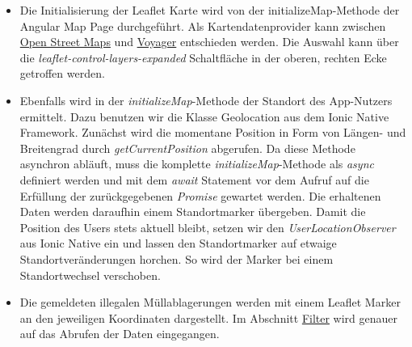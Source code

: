 \documentclass[a4paper, 11pt, DIV=11, listof=numbered, numbers=noenddot]{scrartcl}
\begin{document}
	\begin {itemize}
		\item Die Initialisierung der Leaflet Karte wird von der initializeMap-Methode der Angular Map Page durchgeführt. Als Kartendatenprovider kann zwischen \href{https://www.openstreetmap.org}{Open Street Maps} und \href{http://voyager.basemaps.cartocdn.com}	{Voyager} entschieden werden. Die Auswahl kann über die \textit{leaflet-control-layers-expanded} Schaltfläche in der oberen, rechten Ecke getroffen werden.
		\item Ebenfalls wird in der \textit{initializeMap}-Methode der Standort des App-Nutzers ermittelt. Dazu benutzen wir die Klasse Geolocation aus dem Ionic Native Framework. Zunächst wird die momentane Position in Form von Längen- und Breitengrad durch 					\textit{getCurrentPosition} abgerufen. Da diese Methode asynchron abläuft, muss die komplette \textit{initializeMap}-Methode als \textit{async} definiert werden und mit dem \textit{await} Statement vor dem Aufruf auf die Erfüllung der zurückgegebenen 				\textit{Promise} gewartet werden. Die erhaltenen Daten werden daraufhin einem Standortmarker übergeben.
			Damit die Position des Users stets aktuell bleibt, setzen wir den \textit{UserLocationObserver} aus Ionic Native ein und lassen den Standortmarker auf etwaige Standortveränderungen horchen. So wird der Marker bei einem Standortwechsel verschoben.
		\item Die gemeldeten illegalen Müllablagerungen werden mit einem Leaflet Marker an den jeweiligen Koordinaten dargestellt. Im Abschnitt \hyperref[sec:Filter] {Filter} wird genauer auf das Abrufen der Daten eingegangen.

	\end {itemize}
\end{document}
